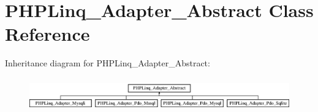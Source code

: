 \hypertarget{class_p_h_p_linq___adapter___abstract}{\section{\-P\-H\-P\-Linq\-\_\-\-Adapter\-\_\-\-Abstract \-Class \-Reference}
\label{class_p_h_p_linq___adapter___abstract}
}
\-Inheritance diagram for \-P\-H\-P\-Linq\-\_\-\-Adapter\-\_\-\-Abstract\-:\begin{figure}[H]
\begin{center}
\leavevmode
\includegraphics[height=1.481482cm]{class_p_h_p_linq___adapter___abstract}
\end{center}
\end{figure}
